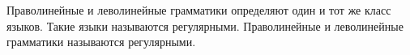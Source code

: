 Праволинейные и леволинейные грамматики определяют один и тот же класс языков. 
Такие языки называются регулярными. 
Праволинейные и леволинейные грамматики называются регулярными.





